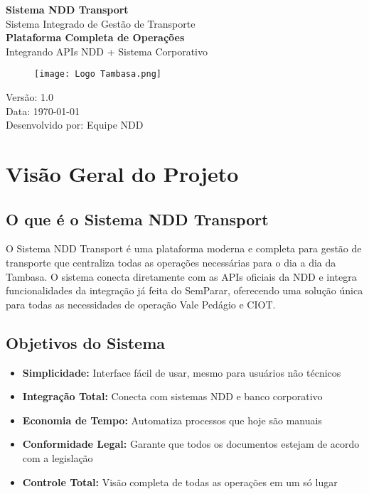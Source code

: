 \documentclass[12pt,a4paper]{article}
\begin{document}
\begin{titlepage}
    \centering
    \vspace*{2cm}

    {\Huge\textcolor{nddblue}{\textbf{Sistema NDD Transport}}}\\[0.5cm]
    {\LARGE\textcolor{nddgray}{Sistema Integrado de Gestão de Transporte}}\\[1.5cm]

    {\Large\textbf{Plataforma Completa de Operações}}\\[0.3cm]
    {\large Integrando APIs NDD + Sistema Corporativo}\\[2cm]

    \begin{figure}[H]
        \centering
        \texttt{[image: Logo Tambasa.png]}
    \end{figure}


    \vfill

    {\large Versão: 1.0}\\[0.3cm]
    {\large Data: \today}\\[0.3cm]
    {\large Desenvolvido por: Equipe NDD}

\end{titlepage}

\tableofcontents
\newpage

\section{Visão Geral do Projeto}

\subsection{O que é o Sistema NDD Transport}
O Sistema NDD Transport é uma plataforma moderna e completa para gestão de transporte que centraliza todas as operações necessárias para o dia a dia da Tambasa. O sistema conecta diretamente com as APIs oficiais da NDD e integra funcionalidades da integração já feita do SemParar, oferecendo uma solução única para todas as necessidades de operação Vale Pedágio e CIOT.

\subsection{Objetivos do Sistema}
\begin{itemize}[leftmargin=2cm]
    \item \textbf{Simplicidade:} Interface fácil de usar, mesmo para usuários não técnicos
    \item \textbf{Integração Total:} Conecta com sistemas NDD e banco corporativo
    \item \textbf{Economia de Tempo:} Automatiza processos que hoje são manuais
    \item \textbf{Conformidade Legal:} Garante que todos os documentos estejam de acordo com a legislação
    \item \textbf{Controle Total:} Visão completa de todas as operações em um só lugar
\end{itemize}
\end{document}
